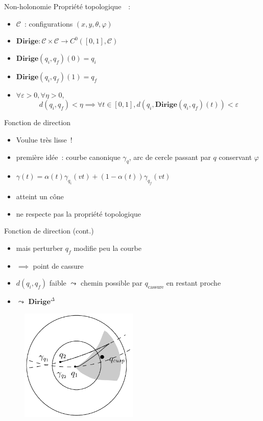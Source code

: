 \documentclass[11pt]{beamer}
\newcommand{\steer}{\textbf{Dirige}}
\newcommand{\steerflat}{\steer^\Delta}
\newcommand{\confspace}{\mathcal{C}}
\newcommand{\qcusp}{q_{\text{cassure}}}
\begin{document}
\begin{frame}{Non-holonomie}
	\og{}Propriété topologique~\fg~:
	\begin{itemize}
		\item $\confspace$~: configurations $(x, y, \theta, \varphi)$
		\item $\steer: \confspace \times \confspace \to C^0(\left[0, 1\right],
			\confspace)$
		\item $\steer(q_i, q_f)(0) = q_i$
		\item $\steer(q_i, q_f)(1) = q_f$
		\item $\forall \varepsilon > 0, \forall \eta > 0$,
			\[d(q_i, q_f) < \eta \implies \forall t \in [0, 1],
			d(q_i, \steer(q_i, q_f)(t)) < \varepsilon \]
	\end{itemize}
\end{frame}

\begin{frame}{Fonction de direction}
	\begin{itemize}
		\item Voulue très lisse~!
		\item première idée~: courbe canonique $\gamma_q$, arc de cercle
			passant par $q$ conservant $\varphi$
		\item $\gamma(t) = \alpha(t) \gamma_{q_i}(vt) + (1-\alpha(t))
			\gamma_{q_f}(vt)$
		\item atteint un \og{}cône~\fg{}
		\item ne respecte pas la propriété topologique
	\end{itemize}
\end{frame}

\begin{frame}{Fonction de direction (cont.)}
	\begin{itemize}
		\item mais perturber $q_f$ modifie peu la courbe
		\item[~] $\implies$ point de cassure
		\item $d(q_i, q_f)$ faible $\leadsto$ chemin possible par
			$\qcusp$ en restant proche
		\item $\leadsto$ $\steerflat$
	\end{itemize}

	\vspace{-3em}
	\begin{figure}
		\flushright{}
		\includegraphics[width=0.5\textwidth]{img/steer.png}
	\end{figure}
\end{frame}
\end{document}
